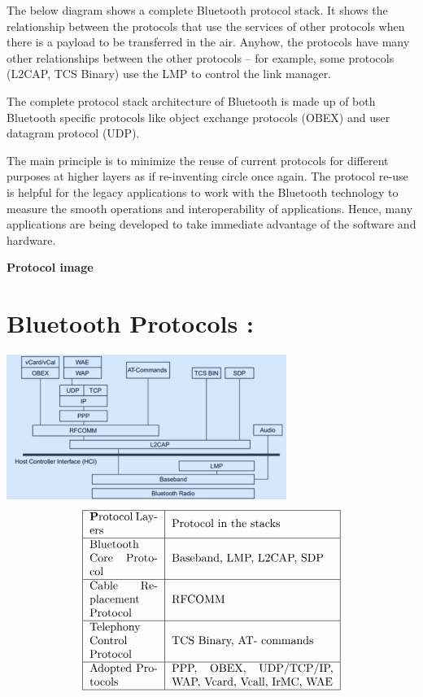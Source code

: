 \documentclass{report}
\begin{document}
\begin{multicols}{1}
    The below diagram shows a complete Bluetooth protocol stack. It shows the relationship between the protocols that use the services of other protocols when there is a payload to be transferred in the air. Anyhow, the protocols have many other relationships between the other protocols – for example, some protocols (L2CAP, TCS Binary) use the LMP to control the link manager.

    The complete protocol stack architecture of Bluetooth is made up of both Bluetooth specific protocols like object exchange protocols (OBEX) and user datagram protocol (UDP).

    The main principle is to minimize the reuse of current protocols for different purposes at higher layers as if re-inventing circle once again. The protocol re-use is helpful for the legacy applications to work with the Bluetooth technology to measure the smooth operations and interoperability of applications. Hence, many applications are being developed to take immediate advantage of the software and hardware.

    \textbf{    Protocol image}
 \section*{Bluetooth Protocols :} 
    \includegraphics{protocols}\\
   \begin{align}
       
    \begin{tabular}{ | m{6em} | m{5cm} | } 
    \hline
    \textbf Protocol Layers & Protocol in the stacks\\ 
    \hline
    Bluetooth Core Protocol & Baseband, LMP, L2CAP, SDP \\ 
    \hline
    Cable Replacement Protocol & RFCOMM\\ 
    \hline
    Telephony Control Protocol & TCS Binary, AT- commands\\
    \hline
    Adopted Protocols & PPP, OBEX, UDP/TCP/IP, WAP, Vcard, Vcall, IrMC, WAE\\
    \hline


\end{tabular}
\end{align}
\end{multicols}
\end{document}
